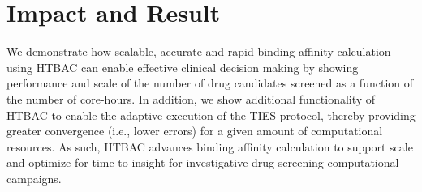 \documentclass[conference]{IEEEtran}
\begin{document}
\section{Impact and Result}\label{sec:demo}









We demonstrate how scalable, accurate and rapid binding affinity calculation 
using HTBAC can enable effective clinical decision making by showing performance 
and scale of the number of drug candidates screened as a function of the 
number of core-hours. In addition, we show additional functionality of HTBAC 
to enable the adaptive execution of the TIES protocol, thereby providing greater 
convergence (i.e., lower errors) for a given amount of computational resources. 
As such, HTBAC advances binding affinity calculation to support scale and 
optimize for time-to-insight for investigative drug screening computational 
campaigns. 




\end{document}
